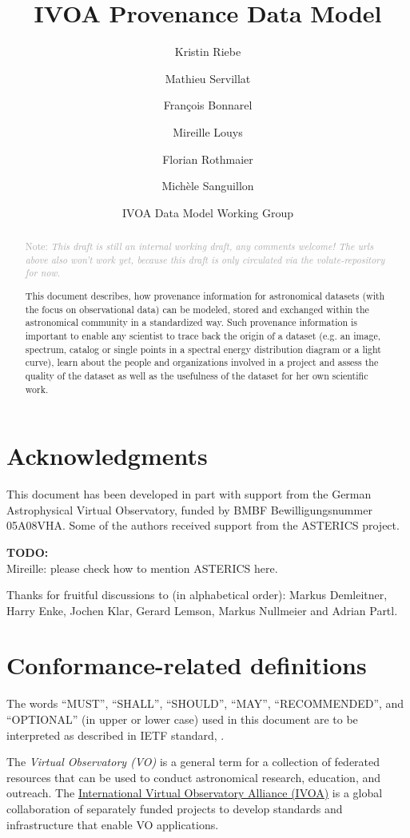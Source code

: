 \documentclass[11pt,a4paper]{ivoa}
\title{IVOA Provenance Data Model}
\author{Kristin Riebe}
\author{Mathieu Servillat}
\author{François Bonnarel}
\author{Mireille Louys}
\author{Florian Rothmaier}
\author{Michèle Sanguillon}
\author{IVOA Data Model Working Group}
\newcommand{\TODO}[1]{%
    \noindent%
    \colorbox{todocolor}{%
            \parbox{0.85\linewidth}{\sffamily \textbf{TODO:}\\
            #1}
    }%
    \vspace{2pt}

}
\newcommand{\note}[1]{%
    \noindent%
    \textcolor{darkgrey}{{\sffamily Note:} \emph{#1}}%
}
\newcommand{\warning}[1]{%
    \vspace{\baselineskip}
    \noindent
    \parbox{\linewidth}{%
        \colorbox{darkred}{%
            \parbox{0.7\linewidth}{\large \sffamily \textcolor{white}{Warning}}%
        }\\[-1pt]
        \noindent%
        \fcolorbox{darkred}{rose}{%
            \parbox{0.7\linewidth-2\fboxrule}{#1}%
        }%
    }%
    \vspace{\baselineskip}
}%
\begin{document}

\begin{abstract}
\note{
  This draft is still an internal working draft, any comments welcome! 
  The urls above also won't work yet, because this draft is only circulated 
  via the volute-repository for now.
}


This document describes, how provenance information for astronomical datasets 
(with the focus on observational data) can be modeled, stored and exchanged within 
the astronomical community in a standardized way.
Such provenance information is important to enable any scientist to trace back
the origin of a dataset (e.g. an image, spectrum, catalog or single points in a 
spectral energy distribution diagram or a light curve), learn about the people and 
organizations involved in a project and assess the quality of the dataset as well
as the usefulness of the dataset for her own scientific work.
\end{abstract}


\section*{Acknowledgments}

This document has been developed in part with support from the German
Astrophysical Virtual Observatory, funded by BMBF Bewilligungsnummer 05A08VHA.
Some of the authors received support from the ASTERICS project.
\TODO{Mireille: please check how to mention ASTERICS here.}

Thanks for fruitful discussions to (in alphabetical order):
Markus Demleitner, Harry Enke, Jochen Klar, Gerard Lemson, Markus Nullmeier
and Adrian Partl.



\section*{Conformance-related definitions}

The words ``MUST'', ``SHALL'', ``SHOULD'', ``MAY'', ``RECOMMENDED'', and
``OPTIONAL'' (in upper or lower case) used in this document are to be
interpreted as described in IETF standard, \citet{std:RFC2119}.

The \emph{Virtual Observatory (VO)} is
a general term for a collection of federated resources that can be used
to conduct astronomical research, education, and outreach.
The \href{http://www.ivoa.net}{International
Virtual Observatory Alliance (IVOA)} is a global
collaboration of separately funded projects to develop standards and
infrastructure that enable VO applications.
\end{document}
